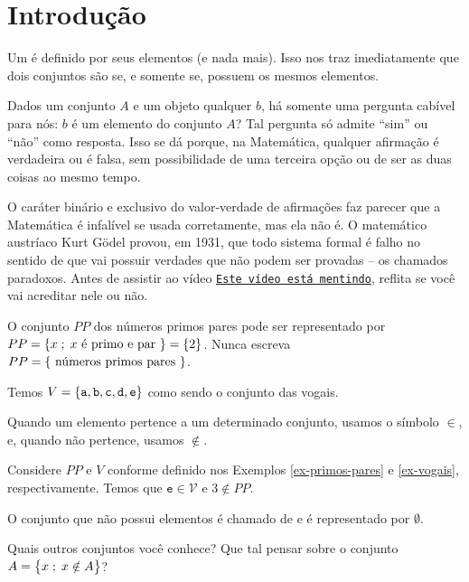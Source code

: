 \section{Introdução}
Um  é definido por seus elementos (e nada mais). Isso nos traz imediatamente que dois conjuntos são  se, e somente se, possuem os mesmos elementos.

Dados um conjunto $A$ e um objeto qualquer $b$, há somente uma pergunta cabível para nós: $b$ é um elemento do conjunto $A$? Tal pergunta só admite ``sim'' ou ``não'' como resposta. Isso se dá porque, na Matemática, qualquer afirmação é verdadeira ou é falsa, sem possibilidade de uma terceira opção ou de ser as duas coisas ao mesmo tempo. 

O caráter binário e exclusivo do valor-verdade de afirmações faz parecer que a Matemática é infalível se usada corretamente, mas ela não é. O matemático austríaco Kurt Gödel provou, em 1931, que todo sistema formal é falho no sentido de que vai possuir verdades que não podem ser provadas -- os chamados paradoxos. Antes de assistir ao vídeo \href{https://youtu.be/UI1xR_AECrU}{{\tt Este vídeo está mentindo}}, reflita se você vai acreditar nele ou não.

\begin{example}
\label{ex-primos-pares}
O conjunto $PP$ dos números primos pares pode ser representado por $PP = \left\{x \;;\; x \text{ é primo e par }\right\} = \left\{2\right\}$. Nunca escreva $PP = \left\{\text{ números primos pares }\right\}$.
\end{example}

\begin{example}
\label{ex-vogais}
Temos $V=\left\{\texttt{a}, \texttt{b}, \texttt{c}, \texttt{d}, \texttt{e}\right\}$ como sendo o conjunto das vogais.
\end{example}

\begin{remark}
Quando um elemento pertence a um determinado conjunto, usamos o símbolo $\in$, e, quando não pertence, usamos $\notin$.
\end{remark}

\begin{example}
Considere $PP$ e $V$ conforme definido nos Exemplos \ref{ex-primos-pares} e \ref{ex-vogais}, respectivamente. Temos que $\texttt{e} \in \mathcal{V}$ e $3 \notin PP$.
\end{example}

\begin{definition}
O conjunto que não possui elementos é chamado de  e é representado por $\emptyset$.
\end{definition}

\begin{example}
Quais outros conjuntos você conhece? Que tal pensar sobre o conjunto $A = \left\{x \;;\; x \notin A\right\}$?
\end{example}